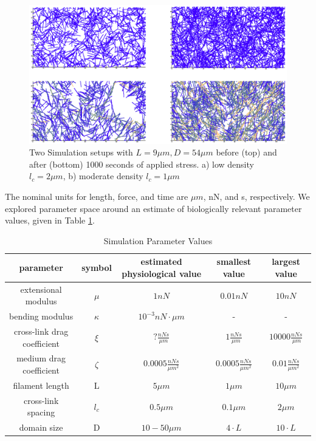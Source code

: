 \documentclass[pre,preprint]{revtex4-1}
\begin{document}
\begin{figure}[h!]
\centering
\includegraphics[width=\hsize]{network_def}
\caption{\label{fig:sim}Two Simulation setups with $L=9 \mu m, D = 54 \mu m$ before (top) and after  (bottom) 1000 seconds of applied stress. a) low density $l_c=2 \mu m$, b) moderate density $l_c=1 \mu m$ }
\end{figure}

The nominal units for length, force, and time are $\mu m$, nN, and s, respectively.  We explored parameter space around an estimate of biologically relevant parameter values, given in Table \ref{table:para}. 

\begin{table}[h]
\centering
\caption{Simulation Parameter Values}
\label{table:para}
\begin{tabular}{|c|c|c|c|c|}
\hline
{\bf parameter}             & {\bf symbol} & {\bf estimated physiological value} & {\bf smallest value}           & {\bf largest value}          \\ \hline
extensional modulus         & $\mu$        & $1 nN $                             & $0.01 nN $                     & $10 nN $                     \\
bending modulus             & $\kappa$     & $ 10^{-3} nN \cdot \mu m$           & -                              & -                            \\
cross-link drag coefficient & $\xi$      & $? \frac{nN s}{\mu m} $             & $1 \frac{nN s}{\mu m} $        & $10000 \frac{nN s}{\mu m} $  \\
medium drag coefficient     & $\zeta$        & $0.0005 \frac{nN s}{\mu m^2} $      & $0.0005 \frac{nN s}{\mu m^2} $ & $0.01 \frac{nN s}{\mu m^2} $ \\
filament length             & L            & $5 \mu m$                           & $ 1\mu m$                      & $10 \mu m$                   \\
cross-link spacing          & $l_c$        & $0.5 \mu m$                         & $0.1 \mu m$                    & $2 \mu m$                    \\
domain size                 & D            & $10-50 \mu m$                       & $4\cdot L$                      & $10\cdot L$                   \\ \hline
\end{tabular}
\end{table}
\end{document}
